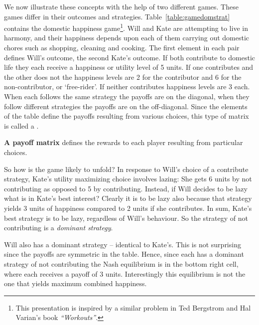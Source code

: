 We now illustrate these concepts with the help of two different games. These
games differ in their outcomes and strategies. Table~\ref{table:gamedomstrat}
contains the domestic happiness game\footnote{%
	This presentation is inspired by a similar problem in Ted Bergstrom and Hal
	Varian's book \textit{``Workouts''}.}. Will
and Kate are attempting to live in harmony, and their happiness depends upon
each of them carrying out domestic chores such as shopping, cleaning and
cooking. The first element in each pair defines Will's outcome, the second
Kate's outcome. If both contribute to domestic life they each receive a
happiness or utility level of 5 units. If one contributes and the other does
not the happiness levels are 2 for the contributor and 6 for the
non-contributor, or `free-rider'. If neither contributes happiness levels
are 3 each. When each follows the same strategy the payoffs are on the
diagonal, when they follow different strategies the payoffs are on the
off-diagonal. Since the elements of the table define the payoffs resulting
from various choices, this type of matrix is called a .

\begin{DefBox}
	\textbf{A payoff matrix} defines the rewards to each player resulting from particular choices.
\end{DefBox}

So how is the game likely to unfold? In response to Will's choice of a
contribute strategy, Kate's utility maximizing choice involves lazing: She
gets 6 units by not contributing as opposed to 5 by contributing. Instead,
if Will decides to be lazy what is in Kate's best interest? Clearly it is to
be lazy also because that strategy yields 3 units of happiness compared to 2
units if she contributes. In sum, Kate's best strategy is to be lazy,
regardless of Will's behaviour. So the strategy of not contributing is a 
\textit{dominant strategy}.

Will also has a dominant strategy -- identical to Kate's. This is not
surprising since the payoffs are symmetric in the table. Hence, since each
has a dominant strategy of not contributing the Nash equilibrium is in the
bottom right cell, where each receives a payoff of 3 units. Interestingly
this equilibrium is not the one that yields maximum combined happiness.

